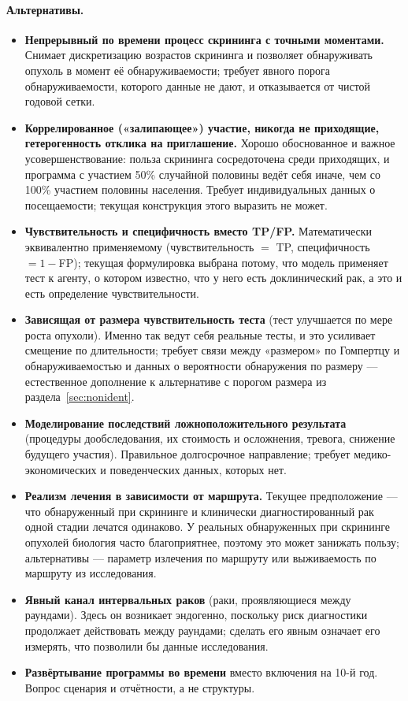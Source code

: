 \documentclass[12pt,a4paper]{article}
\newcommand{\alt}[1]{\paragraph{Альтернативы.} #1}
\begin{document}
\alt{\begin{itemize}[nosep]
  \item \textbf{Непрерывный по времени процесс скрининга с точными моментами.} Снимает дискретизацию
        возрастов скрининга и позволяет обнаруживать опухоль в момент её обнаруживаемости; требует явного
        порога обнаруживаемости, которого данные не дают, и отказывается от чистой годовой сетки.
  \item \textbf{Коррелированное («залипающее») участие, никогда не приходящие, гетерогенность отклика на
        приглашение.} Хорошо обоснованное и важное усовершенствование: польза скрининга сосредоточена среди
        приходящих, и программа с участием 50\% случайной половины ведёт себя иначе, чем со 100\% участием
        половины населения. Требует индивидуальных данных о посещаемости; текущая конструкция этого выразить
        не может.
  \item \textbf{Чувствительность и специфичность вместо TP/FP.} Математически эквивалентно применяемому
        (чувствительность $=$ TP, специфичность $=1-$FP); текущая формулировка выбрана потому, что модель
        применяет тест к агенту, о котором известно, что у него есть доклинический рак, а это и есть
        определение чувствительности.
  \item \textbf{Зависящая от размера чувствительность теста} (тест улучшается по мере роста опухоли). Именно
        так ведут себя реальные тесты, и это усиливает смещение по длительности; требует связи между
        «размером» по Гомпертцу и обнаруживаемостью и данных о вероятности обнаружения по размеру ---
        естественное дополнение к альтернативе с порогом размера из раздела~\ref{sec:nonident}.
  \item \textbf{Моделирование последствий ложноположительного результата} (процедуры дообследования, их
        стоимость и осложнения, тревога, снижение будущего участия). Правильное долгосрочное направление;
        требует медико-экономических и поведенческих данных, которых нет.
  \item \textbf{Реализм лечения в зависимости от маршрута.} Текущее предположение --- что обнаруженный при
        скрининге и клинически диагностированный рак одной стадии лечатся одинаково. У реальных обнаруженных
        при скрининге опухолей биология часто благоприятнее, поэтому это может занижать пользу; альтернативы
        --- параметр излечения по маршруту или выживаемость по маршруту из исследования.
  \item \textbf{Явный канал интервальных раков} (раки, проявляющиеся между раундами). Здесь он возникает
        эндогенно, поскольку риск диагностики продолжает действовать между раундами; сделать его явным
        означает его измерять, что позволили бы данные исследования.
  \item \textbf{Развёртывание программы во времени} вместо включения на 10-й год. Вопрос сценария и
        отчётности, а не структуры.
\end{itemize}}
\end{document}
